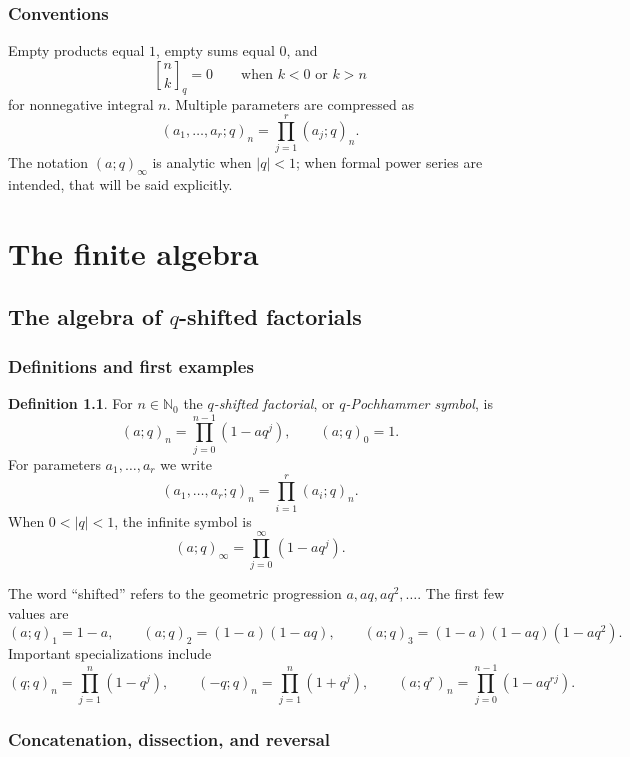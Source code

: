 \documentclass[11pt,oneside,openany]{book}
\theoremstyle{definition}
\newtheorem{definition}[theorem]{Definition}
\theoremstyle{remark}
\newcommand{\qbinom}[2]{\genfrac{[}{]}{0pt}{}{#1}{#2}_{q}}
\newcommand{\N}{\mathbb N}
\newcommand{\abs}[1]{\lvert #1\rvert}
\begin{document}
\section*{Conventions}
Empty products equal $1$, empty sums equal $0$, and
\[
 \qbinom nk=0\qquad\text{when }k<0\text{ or }k>n
\]
for nonnegative integral $n$.  Multiple parameters are compressed as
\[
 (a_1,\ldots,a_r;q)_n=\prod_{j=1}^r(a_j;q)_n.
\]
The notation $(a;q)_\infty$ is analytic when $\abs q<1$; when formal power series are intended, that will be said explicitly.

\tableofcontents

\mainmatter

\part{The finite algebra}

\chapter{The algebra of \texorpdfstring{$q$}{q}-shifted factorials}\label{chap:pochhammer}

\section{Definitions and first examples}

\begin{definition}
For $n\in\N_0$ the \emph{$q$-shifted factorial}, or \emph{$q$-Pochhammer symbol}, is
\[
 (a;q)_n=\prod_{j=0}^{n-1}(1-aq^j),\qquad (a;q)_0=1.
\]
For parameters $a_1,\dots,a_r$ we write
\[
 (a_1,\dots,a_r;q)_n=\prod_{i=1}^r(a_i;q)_n.
\]
When $0<\abs q<1$, the infinite symbol is
\[
 (a;q)_\infty=\prod_{j=0}^{\infty}(1-aq^j).
\]
\end{definition}

The word ``shifted'' refers to the geometric progression $a,aq,aq^2,\ldots$.  The first few values are
\[
 (a;q)_1=1-a,
 \qquad
 (a;q)_2=(1-a)(1-aq),
 \qquad
 (a;q)_3=(1-a)(1-aq)(1-aq^2).
\]
Important specializations include
\[
 (q;q)_n=\prod_{j=1}^n(1-q^j),
 \qquad
 (-q;q)_n=\prod_{j=1}^n(1+q^j),
 \qquad
 (a;q^r)_n=\prod_{j=0}^{n-1}(1-aq^{rj}).
\]

\section{Concatenation, dissection, and reversal}
\end{document}
